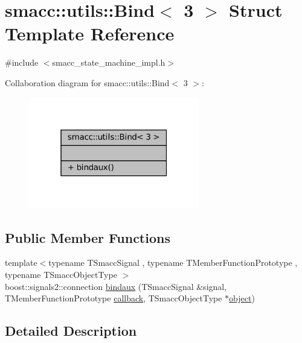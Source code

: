 \hypertarget{structsmacc_1_1utils_1_1Bind_3_013_01_4}{}\section{smacc\+:\+:utils\+:\+:Bind$<$ 3 $>$ Struct Template Reference}
\label{structsmacc_1_1utils_1_1Bind_3_013_01_4}


{\ttfamily \#include $<$smacc\+\_\+state\+\_\+machine\+\_\+impl.\+h$>$}



Collaboration diagram for smacc\+:\+:utils\+:\+:Bind$<$ 3 $>$\+:
\nopagebreak
\begin{figure}[H]
\begin{center}
\leavevmode
\includegraphics[width=211pt]{structsmacc_1_1utils_1_1Bind_3_013_01_4__coll__graph}
\end{center}
\end{figure}
\subsection*{Public Member Functions}
\begin{DoxyCompactItemize}
\item 
{\footnotesize template$<$typename T\+Smacc\+Signal , typename T\+Member\+Function\+Prototype , typename T\+Smacc\+Object\+Type $>$ }\\boost\+::signals2\+::connection \hyperlink{structsmacc_1_1utils_1_1Bind_3_013_01_4_a8958f16a2a40b187e6500a76cfaeed63}{bindaux} (T\+Smacc\+Signal \&signal, T\+Member\+Function\+Prototype \hyperlink{3_2servers_2opencv__perception__node_2opencv__perception__node_8cpp_a050e697bd654facce10ea3f6549669b3}{callback}, T\+Smacc\+Object\+Type $\ast$\hyperlink{classobject}{object})
\end{DoxyCompactItemize}


\subsection{Detailed Description}
